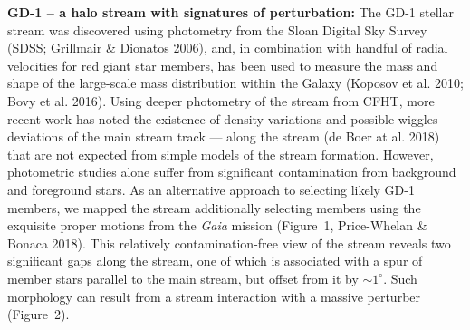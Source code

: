 \documentclass[12pt]{article}
\begin{document}
{\bf GD-1 -- a halo stream with signatures of perturbation:}
The GD-1 stellar stream was discovered using photometry from the Sloan Digital Sky Survey (SDSS; Grillmair \& Dionatos 2006),
and, in combination with handful of radial velocities for red giant star members, has been used to measure the mass and shape of the large-scale mass distribution within the Galaxy (Koposov et al. 2010; Bovy et al. 2016).
Using deeper photometry of the stream from CFHT, more recent work has noted the existence of density variations and possible wiggles --- deviations of the main stream track --- along the stream (de Boer at al. 2018) that are not expected from simple models of the stream formation.
However, photometric studies alone suffer from significant contamination from background and foreground stars.
As an alternative approach to selecting likely GD-1 members, we mapped the stream additionally selecting members using the exquisite proper motions from the \textit{Gaia} mission (Figure~1, Price-Whelan \& Bonaca 2018).
This relatively contamination-free view of the stream reveals two significant gaps along the stream, one of which is associated with a spur of member stars parallel to the main stream, but offset from it by $\sim1^\circ$.
Such morphology can result from a stream interaction with a massive perturber (Figure~2).




\end{document}
